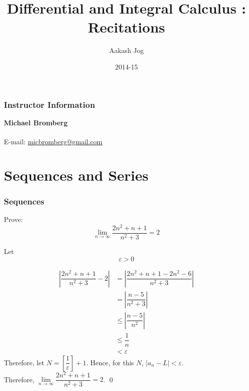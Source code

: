 \documentclass[fleqn, a4paper, 12pt, twoside]{article}
\title{Differential and Integral Calculus : Recitations}
\author{Aakash Jog}
\date{2014-15}
\theoremstyle{definition}
\theoremstyle{theorem}
\begin{document}
\maketitle

\tableofcontents

\newpage
\section{Instructor Information}

\textbf{Michael Bromberg}\\
~\\
E-mail: \href{mailto:micbromberg@gmail.com}{micbromberg@gmail.com}\\

\newpage

\part{Sequences and Series}

\section{Sequences}

\begin{question}
	Prove:
	\begin{equation*}
		\lim\limits_{n \to \infty} \dfrac{2n^2 + n + 1}{n^2 + 3} = 2
	\end{equation*}
\end{question}

\begin{solution}[print]
	Let
	\begin{equation*}
		\varepsilon > 0
	\end{equation*}

	\begin{align*}
		\left| \dfrac{2n^2 + n + 1}{n^2 + 3} - 2 \right| &= \left| \dfrac{2n^2 + n + 1 - 2n^2 - 6}{n^2 + 3} \right|\\
		&= \left| \dfrac{n - 5}{n^2 + 3} \right| \\
		&\leq \left| \dfrac{n - 5}{n^2} \right|\\
		&\leq \dfrac{1}{n}\\
		&< \varepsilon
	\end{align*}
	Therefore, let $N = \left[ \dfrac{1}{\varepsilon} \right] + 1$.
	Hence, for this $N$, $|a_n - L| < \varepsilon$.\\
	Therefore, $\lim\limits_{n \to \infty} \dfrac{2n^2 + n + 1}{n^2 + 3} = 2$.
	\qed
\end{solution}
\end{document}
